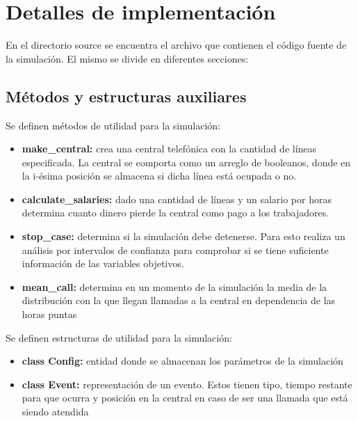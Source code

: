 \documentclass{article}
\begin{document}
	\section*{Detalles de implementación}
	En el directorio source se encuentra el archivo que contienen el código fuente de la simulación. El mismo se divide en diferentes secciones:
	
	\subsection*{Métodos y estructuras auxiliares}
	Se definen métodos de utilidad para la simulación:
	\begin{itemize}[left=2em]
		\item \textbf{make\_central:} crea una central telefónica con la cantidad de líneas especificada. La central se comporta como un arreglo de booleanos, donde en la i-ésima posición se almacena si dicha línea está ocupada o no.
		\item \textbf{calculate\_salaries:} dado una cantidad de líneas y un salario por horas determina cuanto dinero pierde la central como pago a los trabajadores.
		\item \textbf{stop\_case:} determina si la simulación debe detenerse. Para esto realiza un análisis por intervalos de confianza para comprobar si se tiene suficiente información de las variables objetivos.
		\item \textbf{mean\_call:} determina en un momento de la simulación la media de la distribución con la que llegan llamadas a la central en dependencia de las horas puntas
	\end{itemize}
	
	Se definen estructuras de utilidad para la simulación:
	\begin{itemize}[left=2em]
		\item \textbf{class Config:}  entidad donde se almacenan los parámetros de la simulación
		\item \textbf{class Event:} representación de un evento. Estos tienen tipo, tiempo restante para que ocurra y posición en la central en caso de ser una llamada que está siendo atendida
	\end{itemize}
	
\end{document}
